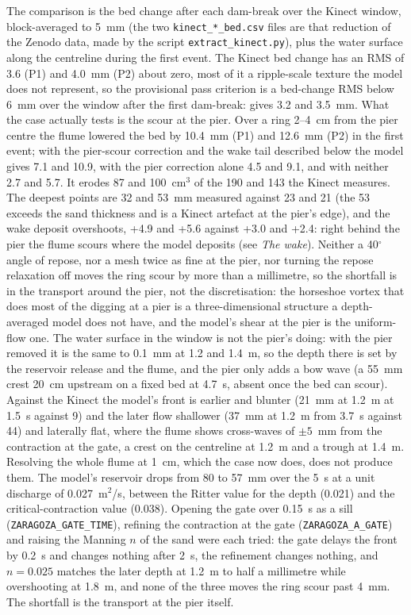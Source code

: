 The comparison is the bed change after each dam-break over the Kinect
window, block-averaged to 5~mm (the two \texttt{kinect\_*\_bed.csv} files
are that reduction of the Zenodo data, made by the script
\texttt{extract\_kinect.py}), plus the water surface along the centreline
during the first event. The Kinect bed change has an RMS of 3.6 (P1) and
4.0~mm (P2) about zero, most of it a ripple-scale texture the model does
not represent, so the provisional pass criterion is a bed-change RMS below
6~mm over the window after the first dam-break: \anuga{} gives 3.2 and
3.5~mm. What the case actually tests is the scour at the pier. Over a ring
2--4~cm from the pier centre the flume lowered the bed by 10.4~mm (P1) and
12.6~mm (P2) in the first event; with the pier-scour correction and the
wake tail described below the model gives 7.1 and 10.9, with the pier
correction alone 4.5 and 9.1, and with neither 2.7 and 5.7. It erodes 87
and 100~cm$^3$ of the 190 and 143 the Kinect measures. The deepest points
are 32 and 53~mm measured against 23 and 21 (the 53 exceeds the sand
thickness and is a Kinect artefact at the pier's edge), and the wake
deposit overshoots, +4.9 and +5.6 against +3.0 and +2.4: right behind the
pier the flume scours where the model deposits (see \emph{The wake}). Neither a 40$^\circ$ angle of repose, nor a mesh
twice as fine at the pier, nor turning the repose relaxation off moves the
ring scour by more than a millimetre, so the shortfall is in the transport
around the pier, not the discretisation: the horseshoe vortex that does
most of the digging at a pier is a three-dimensional structure a
depth-averaged model does not have, and the model's shear at the pier is
the uniform-flow one. The water surface in the window is not the pier's doing: with the pier
removed it is the same to 0.1~mm at 1.2 and 1.4~m, so the depth there is
set by the reservoir release and the flume, and the pier only adds a bow
wave (a 55~mm crest 20~cm upstream on a fixed bed at 4.7~s, absent once
the bed can scour). Against the Kinect the model's front is earlier and
blunter (21~mm at 1.2~m at 1.5~s against 9) and the later flow shallower
(37~mm at 1.2~m from 3.7~s against 44) and laterally flat, where the flume
shows cross-waves of $\pm 5$~mm from the contraction at the gate, a crest
on the centreline at 1.2~m and a trough at 1.4~m. Resolving the whole flume
at 1~cm, which the case now does, does not produce them. The model's reservoir drops from 80 to
57~mm over the 5~s at a unit discharge of 0.027~m$^2$/s, between the
Ritter value for the depth (0.021) and the critical-contraction value
(0.038). Opening the gate over 0.15~s as a sill (\texttt{ZARAGOZA\_GATE\_TIME}),
refining the contraction at the gate (\texttt{ZARAGOZA\_A\_GATE}) and
raising the Manning $n$ of the sand were each tried: the gate delays the
front by 0.2~s and changes nothing after 2~s, the refinement changes
nothing, and $n = 0.025$ matches the later depth at 1.2~m to half a
millimetre while overshooting at 1.8~m, and none of the three moves the
ring scour past 4~mm. The shortfall is the transport at the pier itself.

